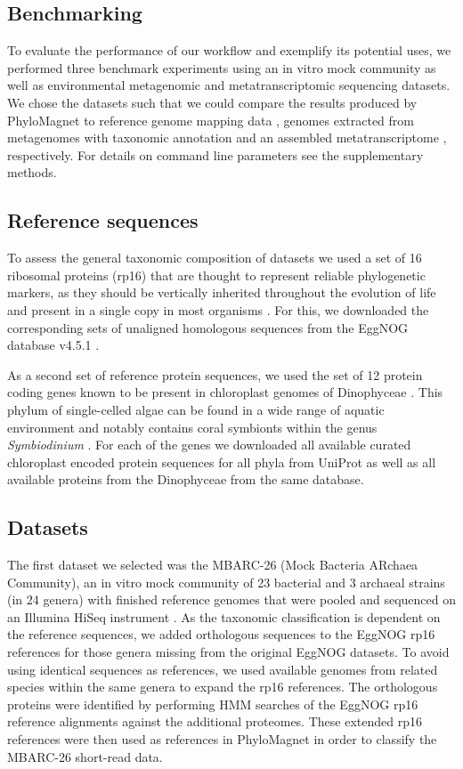 \documentclass{bioinfo}
\begin{document}
\begin{methods}
\section{Benchmarking}
To evaluate the performance of our workflow and exemplify its potential uses, we performed three benchmark experiments using an in vitro mock community as well as environmental metagenomic and metatranscriptomic sequencing datasets. We chose the datasets such that we could compare the results produced by PhyloMagnet to reference genome mapping data \citep{Singer2016}, genomes extracted from metagenomes with taxonomic annotation \citep{Delmont2018} and an assembled metatranscriptome \citep{Frazier2017}, respectively. For details on command line parameters see the supplementary methods.

\subsection{Reference sequences}
To assess the general taxonomic composition of datasets we used a set of 16 ribosomal proteins (rp16) that are thought to represent reliable phylogenetic markers, as they should be vertically inherited throughout the evolution of life and present in a single copy in most organisms \citep{Brown2015}. For this, we downloaded the corresponding sets of unaligned homologous sequences from the EggNOG database v4.5.1 \citep[][see. Table SX]{Huerta-cepas2016b}.

As a second set of reference protein sequences, we used the set of 12 protein coding genes known to be present in chloroplast genomes of Dinophyceae \citep{Howe2008}. This phylum of single-celled algae can be found in a wide range of aquatic environment and notably contains coral symbionts within the genus \textit{Symbiodinium} \citep{Gomez2012}. For each of the genes we downloaded all available curated chloroplast encoded protein sequences for all phyla from UniProt \citep{Apweiler2004} as well as all available proteins from the Dinophyceae from the same database.

\subsection{Datasets}
The first dataset we selected was the MBARC-26 (Mock Bacteria ARchaea Community), an in vitro mock community of 23 bacterial and 3 archaeal strains (in 24 genera) with finished reference genomes that were pooled and sequenced on an Illumina HiSeq instrument \citep{Singer2016}. As the taxonomic classification is dependent on the reference sequences, we added orthologous sequences to the EggNOG rp16 references for those genera missing from the original EggNOG datasets. To avoid using identical sequences as references, we used available genomes from related species within the same genera to expand the rp16 references. The orthologous proteins were identified by performing HMM \citep[HMMER v3.1b2;][]{Eddy2011} searches of the EggNOG rp16 reference alignments against the additional proteomes. These extended rp16 references were then used as references in PhyloMagnet in order to classify the MBARC-26 short-read data. 


\end{methods}
\end{document}
